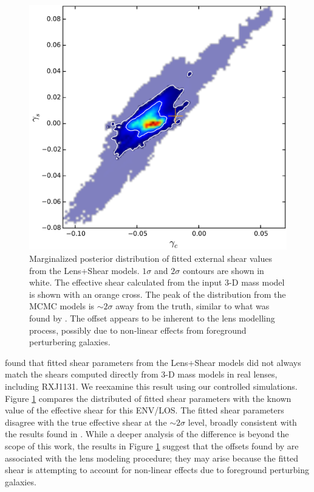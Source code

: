 \documentclass{emulateapj}
\begin{document}
\begin{figure}[ht]
\centering
\includegraphics[width=\columnwidth]{shear_offset.pdf}
\caption{Marginalized posterior distribution of fitted external shear values from the Lens+Shear models. $1\sigma$ and $2\sigma$ contours are shown in white. The effective shear calculated from the input 3-D mass model is shown with an orange cross. The peak of the distribution from the MCMC models is $\sim 2 \sigma$ away from the truth, similar to what was found by \citet{Wong11}. The offset appears to be inherent to the lens modelling process, possibly due to non-linear effects from foreground perturbering galaxies.}
\label{fig:shear_compare}
\end{figure}

\citet{Wong11} found that fitted shear parameters from the Lens+Shear models did not always match the shears computed directly from 3-D mass models in real lenses, including RXJ1131. We reexamine this result using our controlled simulations. Figure \ref{fig:shear_compare} compares the distributed of fitted shear parameters with the known value of the effective shear for this ENV/LOS. The fitted shear parameters disagree with the true effective shear at the $\sim 2\sigma$ level, broadly consistent with the results found in \citet{Wong11}. While a deeper analysis of the difference is beyond the scope of this work, the results in Figure \ref{fig:shear_compare} suggest that the offsets found by \citet{Wong11} are associated with the lens modeling procedure; they may arise because the fitted shear is attempting to account for non-linear effects due to foreground perturbing galaxies.
\end{document}
